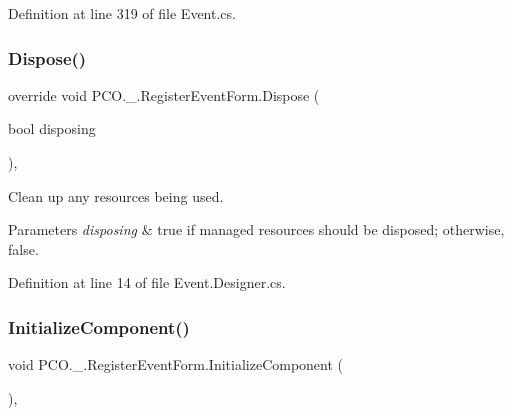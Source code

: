 Definition at line 319 of file Event.\+cs.

\mbox{\label{classPCO_1_1__0_1_1RegisterEventForm_a0ae9bae95772a971a0a1965e912d1570}} 
\subsubsection{\texorpdfstring{Dispose()}{Dispose()}}
{\footnotesize\ttfamily override void P\+C\+O.\+\_.\+Register\+Event\+Form.\+Dispose (\begin{DoxyParamCaption}\item[{bool}]{disposing }\end{DoxyParamCaption})\hspace{0.3cm}{\ttfamily [inline]}, {\ttfamily [protected]}}



Clean up any resources being used. 


\begin{DoxyParams}{Parameters}
{\em disposing} & true if managed resources should be disposed; otherwise, false.\\
\hline
\end{DoxyParams}


Definition at line 14 of file Event.\+Designer.\+cs.

\mbox{\label{classPCO_1_1__0_1_1RegisterEventForm_a86205dc5856bd764865a4ee455f0aae9}} 
\subsubsection{\texorpdfstring{Initialize\+Component()}{InitializeComponent()}}
{\footnotesize\ttfamily void P\+C\+O.\+\_.\+Register\+Event\+Form.\+Initialize\+Component (\begin{DoxyParamCaption}{ }\end{DoxyParamCaption})\hspace{0.3cm}{\ttfamily [inline]}, {\ttfamily [private]}}



